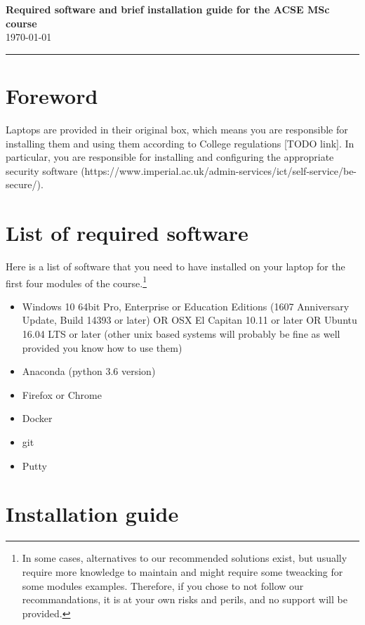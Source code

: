 \documentclass[11pt]{article}
\begin{document}
\begin{center}
{\bf \Large Required software and brief installation guide for the ACSE MSc course } \\ \today
\end{center}
\hrule
\vspace*{1cm}


\section{Foreword}

Laptops are provided in their original box, which means you are responsible for installing them and using them according to College regulations [TODO link]. In particular, you are responsible for installing and configuring the appropriate security software (https://www.imperial.ac.uk/admin-services/ict/self-service/be-secure/).

\section{List of required software}

Here is a list of  software that you need to have installed on your laptop for the first four modules of the course.\footnote{In some cases, alternatives to our recommended solutions exist, but usually require more knowledge to maintain and might require some tweacking for some modules examples. Therefore, if you chose to not follow our recommandations, it is at your own risks and perils, and no support will be provided.}

\begin{itemize}
  \item Windows 10  64bit Pro, Enterprise or Education Editions (1607 Anniversary Update, Build 14393 or later) OR OSX  El Capitan 10.11 or later OR Ubuntu 16.04 LTS or later (other unix based systems will probably be fine as well provided you know how to use them)
  \item Anaconda (python 3.6 version)
  \item Firefox or Chrome
  \item Docker
  \item git
  \item Putty
\end{itemize}


\section{Installation guide}
\end{document}
